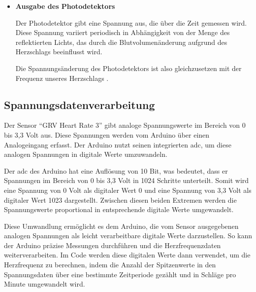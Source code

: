 {\begin{itemize}[label={}]
\begin{figure}[h]

            \caption{Der Photoeffekt}
            \label{fig:Photoeffekt}	
        \end{figure}
        
        \item \textbf{Ausgabe des Photodetektors}
        
        Der Photodetektor gibt eine Spannung aus, die über die Zeit gemessen wird. Diese Spannung variiert periodisch in Abhängigkeit von der Menge des reflektierten Lichts, das durch die Blutvolumenänderung aufgrund des Herzschlags beeinflusst wird.
        
        Die Spannungsänderung des Photodetektors ist also gleichzusetzen mit der Frequenz unseres Herzschlags \cite{Traenkler:2014}. 
    \end{itemize}
    
    
    \subsection{Spannungsdatenverarbeitung}
    
    Der Sensor ``GRV Heart Rate 3'' gibt analoge Spannungswerte im Bereich von 0 bis 3,3 Volt aus. Diese Spannungen werden vom Arduino über einen Analogeingang erfasst. Der Arduino nutzt seinen integrierten \ac{adc}, um diese analogen Spannungen in digitale Werte umzuwandeln.
    
    Der \ac{adc} des Arduino hat eine Auflösung von 10 Bit, was bedeutet, dass er Spannungen im Bereich von 0 bis 3,3 Volt in 1024 Schritte unterteilt. Somit wird eine Spannung von 0 Volt als digitaler Wert 0 und eine Spannung von 3,3 Volt als digitaler Wert 1023 dargestellt. Zwischen diesen beiden Extremen werden die Spannungswerte proportional in entsprechende digitale Werte umgewandelt.\cite{Parthier:2016}
    
    Diese Umwandlung ermöglicht es dem Arduino, die vom Sensor ausgegebenen analogen Spannungen als leicht verarbeitbare digitale Werte darzustellen. So kann der Arduino präzise Messungen durchführen und die Herzfrequenzdaten weiterverarbeiten. Im Code werden diese digitalen Werte dann verwendet, um die Herzfrequenz zu berechnen, indem die Anzahl der Spitzenwerte in den Spannungsdaten über eine bestimmte Zeitperiode gezählt und in Schläge pro Minute umgewandelt wird.
    
}
